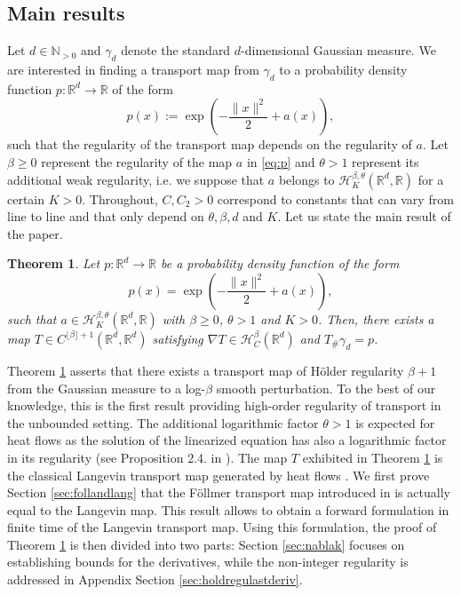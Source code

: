 \documentclass{article}
\newtheorem{theorem}{Theorem}
\begin{document}
\subsection{Main results}
Let $d\in \mathbb{N}_{>0}$ and $\gamma_d$ denote the standard $d$-dimensional Gaussian measure. We are interested in finding a transport map from  $\gamma_d$ to a probability density function $p:\mathbb{R}^d\rightarrow \mathbb{R}$ of the form \begin{equation}\label{eq:p}
p(x):=\exp\left(-\frac{\|x\|^2}{2}+a(x)\right),
\end{equation}
such that the regularity of the transport map depends on the regularity of $a$.
Let  $\beta\geq 0$ represent the regularity of the map $a$ in \eqref{eq:p} and $\theta>1$ represent its additional weak regularity, i.e. we suppose that $a$ belongs to $ \mathcal{H}^{\beta,\theta}_K(\mathbb{R}^d,\mathbb{R})$ for a certain $K>0$. Throughout,  $C,C_2>0$ correspond to constants that can vary from line to line and that only depend on $\theta,\beta,d$ and $K$. Let us state the main result of the paper.

\begin{theorem}\label{theo:thetheo}
Let $p:\mathbb{R}^d\rightarrow \mathbb{R}$ be a probability density function of the form $$p(x)=\exp\left(-\frac{\|x\|^2}{2}+a(x)\right),$$
such that $a \in \mathcal{H}^{\beta,\theta}_K(\mathbb{R}^d,\mathbb{R})$ with $\beta\geq 0$, $\theta>1$ and $K>0$. Then, there exists a map $T\in C^{\lfloor \beta \rfloor+1}(\mathbb{R}^d,\mathbb{R}^d)$ satisfying $\nabla T\in  \mathcal{H}^{\beta}_C  (\mathbb{R}^d)$ and $T_{\#}\gamma_d=p$.
\end{theorem}

Theorem \ref{theo:thetheo} asserts that there exists a transport map of Hölder regularity $\beta+1$ from the Gaussian measure to a log-$\beta$ smooth perturbation. To the best of our knowledge, this is the first result providing high-order regularity of transport in the unbounded setting. The additional logarithmic factor $\theta>1$ is expected for heat flows as the solution of the linearized equation has also a logarithmic factor in its regularity (see Proposition 2.4. in \cite{gallouet2018regularity}).  The  map $T$ exhibited in Theorem \ref{theo:thetheo} is the
classical Langevin transport map generated by heat flows \citep{kim2012generalization,fathi2024transportation,mikulincer2023lipschitz}.
We first prove Section \ref{sec:follandlang} that the Föllmer transport map introduced in \cite{dai2023lipschitz} is actually equal to the Langevin map.
This result allows to obtain a forward formulation in finite time of the Langevin transport map.  Using this formulation, the proof of Theorem \ref{theo:thetheo} is then divided into two parts: Section \ref{sec:nablak}
focuses on establishing bounds for the derivatives, while the non-integer regularity is addressed in Appendix Section \ref{sec:holdregulastderiv}.
\end{document}
